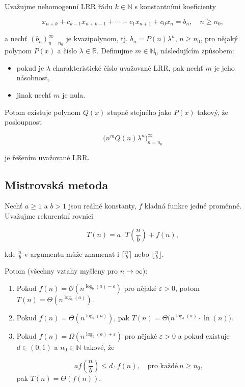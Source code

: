Uvažujme nehomogenní LRR řádu $k \in \mathbb{N}$ s konstantními koeficienty

\[ x_{n+k} + c_{k-1} x_{n+k-1} + \cdots + c_1 x_{n+1} + c_0 x_{n} = b_n, \quad n \geq n_0, \]

\noindent a nechť $(b_n)_{n=n_0}^\infty$ je kvazipolynom, tj. $b_n = P(n) \lambda^n$, $n \geq n_0$, pro nějaký polynom $P(x)$ a číslo $\lambda\in\mathbb{R}$.
Definujme $m \in \mathbb{N}_0$ následujícím způsobem:

\begin{itemize}
    \item pokud je $\lambda$ charakteristické číslo uvažované LRR, pak nechť $m$ je jeho
          násobnost,
    \item jinak nechť $m$ je nula.
\end{itemize}

\noindent Potom existuje polynom $Q(x)$ stupně stejného jako $P(x)$ takový, že
posloupnost

\[ \Big( n^m Q(n) \lambda^n \Big)_{n = n_0}^\infty \]

\noindent je řešením uvažované LRR.

\subsection*{Mistrovská metoda}

Nechť $a \geq 1$ a $b > 1$ jsou reálné konstanty, $f$ kladná funkce jedné
proměnné. Uvažujme rekurentní rovnici

\[ T(n) = a \cdot T\left( \frac{n}{b} \right) + f(n), \]

\noindent kde $\frac{n}{b}$ v argumentu může znamenat i $\lceil \frac{n}{b} \rceil$ nebo $\lfloor \frac{n}{b} \rfloor$.

\noindent Potom (všechny vztahy myšleny pro $n \to \infty$):

\begin{enumerate}
    \item Pokud $f(n) = \mathcal{O}(n^{\log_b(a) - \varepsilon})$ pro nějaké $\varepsilon
              > 0$, potom $T(n) = \Theta(n^{\log_b(a)})$.
    \item Pokud $f(n) = \Theta(n^{\log_b(a)})$, pak $T(n) = \Theta\big(n^{\log_b(a)}
              \cdot \ln(n)\big)$.
    \item Pokud $f(n) = \Omega(n^{\log_b(a) + \varepsilon})$ pro nějaké $\varepsilon > 0$
          a pokud existuje $d \in (0, 1)$ a $n_0 \in \mathbb{N}$ takové, že

          \[ a f\left( \frac{n}{b} \right) \leq d \cdot f(n), \quad \text{pro každé} \ n \geq n_0, \]
          \noindent pak $T(n) = \Theta(f(n))$.
\end{enumerate}

\pagebreak